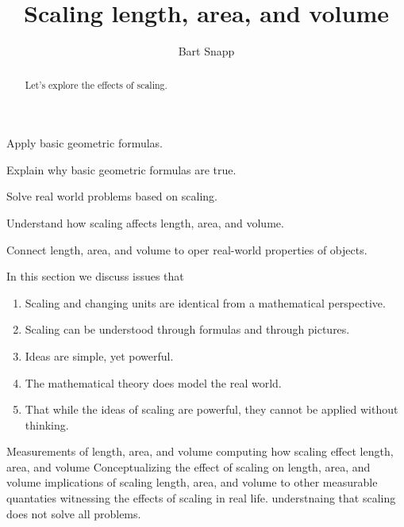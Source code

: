 \documentclass[handout,nooutcomes,noauthor]{ximera}
\title{Scaling length, area, and volume}
\author{Bart Snapp}
\begin{document}
\begin{abstract}
  Let's explore the effects of scaling.
\end{abstract}
\maketitle


\begin{listSectionOutcomes}
\item Apply basic geometric formulas. 
\item Explain why basic geometric formulas are true.
\item Solve real world problems based on scaling.
\item Understand how scaling affects length, area, and
  volume.
\item  Connect length, area, and volume to oper real-world properties of objects.
\end{listSectionOutcomes}

In this section we discuss issues that

\begin{enumerate}
\item Scaling and changing units are identical from a mathematical
  perspective.
\item Scaling can be understood through formulas and through pictures.
\item Ideas are simple, yet powerful.
\item The mathematical theory does model the real world.
\item That while the ideas of scaling are powerful, they cannot be
  applied without thinking.
\end{enumerate}



Measurements of length, area, and volume
computing how  scaling effect length, area, and volume
Conceptualizing the effect of scaling on  length, area, and volume
implications of scaling  length, area, and volume to other measurable quantaties
witnessing the effects of scaling in real life.
understnaing that scaling does not solve all problems.
\end{document}
